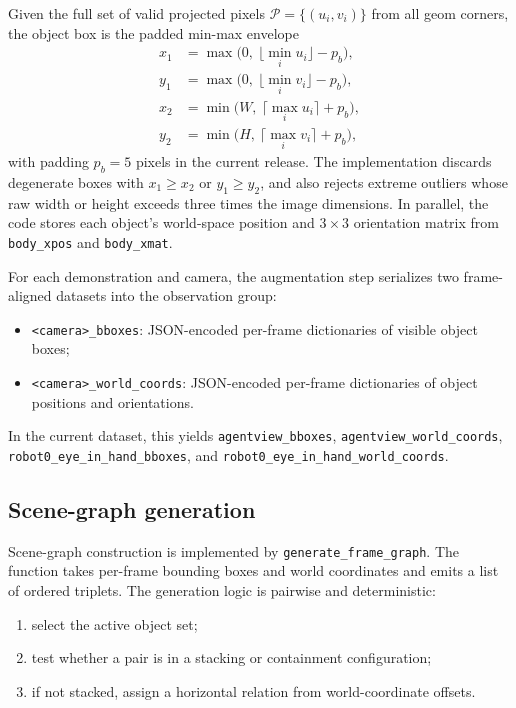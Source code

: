 \documentclass{article}
\begin{document}
Given the full set of valid projected pixels $\mathcal{P} = \{(u_i,v_i)\}$ from all geom corners, the object box is the padded min-max envelope
\begin{equation}
\begin{aligned}
x_1 &= \max\!\bigl(0,\ \lfloor \min_i u_i \rfloor - p_b \bigr), \\
y_1 &= \max\!\bigl(0,\ \lfloor \min_i v_i \rfloor - p_b \bigr), \\
x_2 &= \min\!\bigl(W,\ \lceil \max_i u_i \rceil + p_b \bigr), \\
y_2 &= \min\!\bigl(H,\ \lceil \max_i v_i \rceil + p_b \bigr),
\end{aligned}
\end{equation}
with padding $p_b = 5$ pixels in the current release. The implementation discards degenerate boxes with $x_1 \ge x_2$ or $y_1 \ge y_2$, and also rejects extreme outliers whose raw width or height exceeds three times the image dimensions. In parallel, the code stores each object's world-space position and $3\times3$ orientation matrix from \texttt{body\_xpos} and \texttt{body\_xmat}.

For each demonstration and camera, the augmentation step serializes two frame-aligned datasets into the observation group:
\begin{itemize}
    \item \texttt{<camera>\_bboxes}: JSON-encoded per-frame dictionaries of visible object boxes;
    \item \texttt{<camera>\_world\_coords}: JSON-encoded per-frame dictionaries of object positions and orientations.
\end{itemize}
In the current dataset, this yields \texttt{agentview\_bboxes}, \texttt{agentview\_world\_coords}, \texttt{robot0\_eye\_in\_hand\_bboxes}, and \texttt{robot0\_eye\_in\_hand\_world\_coords}.

\subsection{Scene-graph generation}
Scene-graph construction is implemented by \texttt{generate\_frame\_graph}. The function takes per-frame bounding boxes and world coordinates and emits a list of ordered triplets. The generation logic is pairwise and deterministic:
\begin{enumerate}
    \item select the active object set;
    \item test whether a pair is in a stacking or containment configuration;
    \item if not stacked, assign a horizontal relation from world-coordinate offsets.
\end{enumerate}
\end{document}
